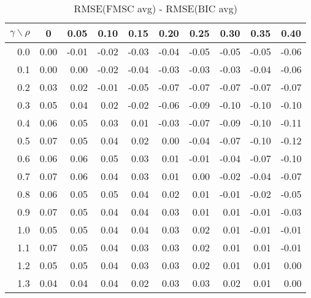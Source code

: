 \documentclass[12pt]{article}
\begin{document}
\begin{table}[!tbp]
\caption{RMSE(FMSC avg) - RMSE(BIC avg)}
 \begin{center}
 \begin{tabular}{r|rrrrrrrrr}\hline\hline
\multicolumn{1}{c|}{$\gamma\backslash\rho$}&\multicolumn{1}{c}{0}&\multicolumn{1}{c}{0.05}&\multicolumn{1}{c}{0.10}&\multicolumn{1}{c}{0.15}&\multicolumn{1}{c}{0.20}&\multicolumn{1}{c}{0.25}&\multicolumn{1}{c}{0.30}&\multicolumn{1}{c}{0.35}&\multicolumn{1}{c}{0.40}\tabularnewline
\hline

0.0&0.00&-0.01&-0.02&-0.03&-0.04&-0.05&-0.05&-0.05&-0.06\tabularnewline
0.1&0.00& 0.00&-0.02&-0.04&-0.03&-0.03&-0.03&-0.04&-0.06\tabularnewline
0.2&0.03& 0.02&-0.01&-0.05&-0.07&-0.07&-0.07&-0.07&-0.07\tabularnewline
0.3&0.05& 0.04& 0.02&-0.02&-0.06&-0.09&-0.10&-0.10&-0.10\tabularnewline
0.4&0.06& 0.05& 0.03& 0.01&-0.03&-0.07&-0.09&-0.10&-0.11\tabularnewline
0.5&0.07& 0.05& 0.04& 0.02& 0.00&-0.04&-0.07&-0.10&-0.12\tabularnewline
0.6&0.06& 0.06& 0.05& 0.03& 0.01&-0.01&-0.04&-0.07&-0.10\tabularnewline
0.7&0.07& 0.06& 0.04& 0.03& 0.01& 0.00&-0.02&-0.04&-0.07\tabularnewline
0.8&0.06& 0.05& 0.05& 0.04& 0.02& 0.01&-0.01&-0.02&-0.05\tabularnewline
0.9&0.07& 0.05& 0.04& 0.04& 0.03& 0.01& 0.01&-0.01&-0.03\tabularnewline
1.0&0.05& 0.05& 0.04& 0.04& 0.03& 0.02& 0.01&-0.01&-0.01\tabularnewline
1.1&0.07& 0.05& 0.04& 0.03& 0.03& 0.02& 0.01& 0.01&-0.01\tabularnewline
1.2&0.05& 0.05& 0.04& 0.03& 0.03& 0.02& 0.01& 0.01& 0.00\tabularnewline
1.3&0.04& 0.04& 0.04& 0.02& 0.03& 0.03& 0.02& 0.01& 0.00\tabularnewline
\hline
\end{tabular}

\end{center}

\end{table}
\end{document}
